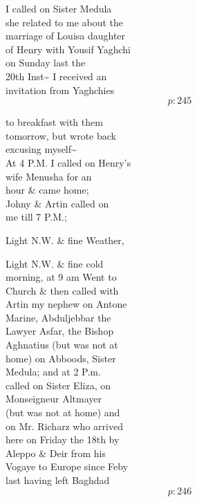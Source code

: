 \documentclass{report}
\begin{document}
	\par{
 	I called on Sister Medula\ \\she related to me about the\ \\marriage of Louisa daughter\ \\of Henry with Yousif Yaghchi\ \\on Sunday last the\ \\20th Inst\~{} I received an\ \\invitation from Yaghchies\ \\
  \[p: 245 \]

	}



	\par{
 	to breakfast with them\ \\tomorrow, but wrote back\ \\excusing myself\~{}\ \\At 4 P.M. I called on Henry’s\ \\wife Menusha for an\ \\hour \& came home;\ \\Johny \& Artin called on\ \\me till 7 P.M.;\ \\
	}

	\par{
 	Light N.W. \& fine Weather,\ \\
	}

	\par{
 	Light N.W. \& fine cold\ \\morning, at 9 am Went to\ \\Church \& then called with\ \\Artin my nephew on Antone\ \\Marine, Abduljebbar the\ \\Lawyer Asfar, the Bishop\ \\Aghnatius (but was not at\ \\home) on Abboods, Sister\ \\Medula; and at 2 P.m.\ \\called on Sister Eliza, on\ \\Monseigneur Altmayer\ \\(but was not at home) and\ \\on Mr. Richarz who arrived\ \\here on Friday the 18th by\ \\Aleppo \& Deir from his\ \\Vogaye to Europe since Feby\ \\last having left Baghdad\ \\
  \[p: 246 \]

	}
\end{document}
